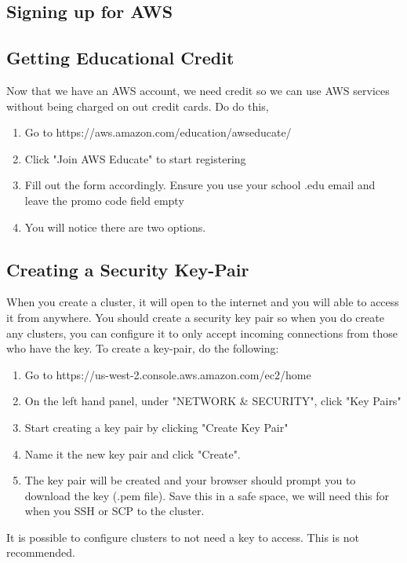 \documentclass{article}
\begin{document}
\subsection{Signing up for AWS}
\subsection{Getting Educational Credit}
Now that we have an AWS account, we need credit so we can use AWS services without being charged on out credit cards. Do do this, 
\begin{enumerate}
    \item Go to https://aws.amazon.com/education/awseducate/
    \item Click "Join AWS Educate" to start registering
    \item Fill out the form accordingly. Ensure you use your school .edu email and leave the promo code field empty
    \item You will notice there are two options. 
    
\end{enumerate}

\subsection{Creating a Security Key-Pair}
When you create a cluster, it will open to the internet and you will able to access it from anywhere. You should create a security key pair so when you do create any clusters, you can configure it to only accept incoming connections from those who have the key. To create a key-pair, do the following:

\begin{enumerate}
    \item Go to https://us-west-2.console.aws.amazon.com/ec2/home
    \item On the left hand panel, under "NETWORK \& SECURITY", click "Key Pairs"
    \item Start creating a key pair by clicking "Create Key Pair"
    \item Name it the new key pair and click "Create".
    \item The key pair will be created and your browser should prompt you to download the key (.pem file). Save this in a safe space, we will need this for when you SSH or SCP to the cluster. 
\end{enumerate}

\begin{info}
It is possible to configure clusters to not need a key to access. This is not recommended.
\end{info}
\end{document}
